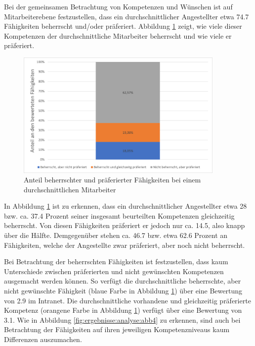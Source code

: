 Bei der gemeinsamen Betrachtung von Kompetenzen und Wünschen ist auf Mitarbeiterebene festzustellen, dass ein durchschnittlicher Angestellter etwa 74.7 Fähigkeiten beherrscht und/oder präferiert. Abbildung \ref{fig:ergebnisse:analyse:abb3} zeigt, wie viele dieser Kompetenzen der durchschnittliche Mitarbeiter beherrscht und wie viele er präferiert.

\begin{figure}[h]
	\centering
	\includegraphics[width=0.9\textwidth]{gfx/auswertung-anteil-an-faehigkeiten.png}
	\caption{Anteil beherrschter und präferierter Fähigkeiten bei einem durchschnittlichen Mitarbeiter}
	\label{fig:ergebnisse:analyse:abb3}
\end{figure}

In Abbildung \ref{fig:ergebnisse:analyse:abb3} ist zu erkennen, dass ein durchschnittlicher Angestellter etwa 28 bzw. ca. 37.4 Prozent seiner insgesamt beurteilten Kompetenzen gleichzeitig beherrscht. Von diesen Fähigkeiten präferiert er jedoch nur ca. 14.5, also knapp über die Hälfte. Demgegenüber stehen ca. 46.7 bzw. etwa 62.6 Prozent an Fähigkeiten, welche der Angestellte zwar präferiert, aber noch nicht beherrscht.

Bei Betrachtung der beherrschten Fähigkeiten ist festzustellen, dass kaum Unterschiede zwischen präferierten und nicht gewünschten Kompetenzen ausgemacht werden können. So verfügt die durchschnittliche beherrschte, aber nicht gewünschte Fähigkeit (blaue Farbe in Abbildung \ref{fig:ergebnisse:analyse:abb3}) über eine Bewertung von 2.9 im Intranet. Die durchschnittliche vorhandene und gleichzeitig präferierte Kompetenz (orangene Farbe in Abbildung \ref{fig:ergebnisse:analyse:abb3}) verfügt über eine Bewertung von 3.1. Wie in Abbildung \ref{fig:ergebnisse:analyse:abb4} zu erkennen, sind auch bei Betrachtung der Fähigkeiten auf ihren jeweiligen Kompetenzniveaus kaum Differenzen auszumachen.

